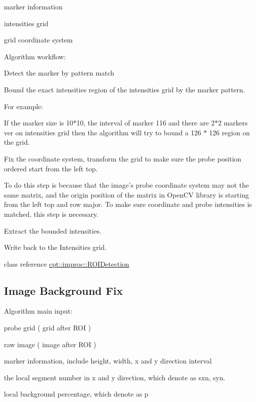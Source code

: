 \begin{DoxyItemize}
\item marker information
\item intensities grid
\item grid coordinate system
\end{DoxyItemize}

Algorithm workflow\-:


\begin{DoxyEnumerate}
\item Detect the marker by pattern match
\item Bound the exact intensities region of the intensities grid by the marker pattern.\par
 For example\-: \par
 If the marker size is 10$\ast$10, the interval of marker 116 and there are 2$\ast$2 markers ver on intensities grid then the algorithm will try to bound a 126 $\ast$ 126 region on the grid. \par

\item Fix the coordinate system, transform the grid to make sure the probe position ordered start from the left top. \par
 To do this step is because that the image's probe coordinate system may not the same matrix, and the origin position of the matrix in Open\-C\-V library is starting from the left top and row major. To make sure coordinate and probe intensities is matched, this step is necessary.
\item Extract the bounded intensities.
\item Write back to the Intensities grid.

class reference \hyperlink{structcpt_1_1improc_1_1_r_o_i_detection}{cpt\-::improc\-::\-R\-O\-I\-Detection} 
\end{DoxyEnumerate}\hypertarget{improc_background_fix_sub_and_division01}{}\subsection{Image Background Fix}\label{improc_background_fix_sub_and_division01}
Algorithm main input\-:


\begin{DoxyItemize}
\item probe grid ( grid after R\-O\-I )
\item raw image ( image after R\-O\-I )
\item marker information, include height, width, x and y direction interval
\item the local segment number in x and y direction, which denote as sxn, syn.
\item local background percentage, which denote as p
\end{DoxyItemize}

